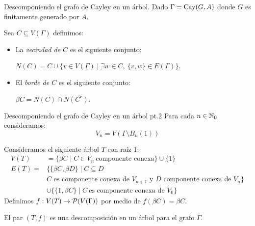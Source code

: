 \documentclass[aspectratio=169, 11pt]{beamer}
\begin{document}
	\begin{frame}[fragile]{Descomponiendo el grafo de Cayley en un árbol.}
		Dado $\Gamma = \text{Cay}(G, A)$ donde $G$ es finitamente generado por $A$.

		Sea $C \subseteq V(\Gamma)$ definimos:
		\begin{itemize}
			\item  
				La \textit{vecindad de $C$} es el siguiente conjunto:

				$N(C) = C \cup \{ v \in V(\Gamma) \mid \exists w \in C, \ \{v,w \} \in E(\Gamma) \}.$

			\item 
				El \textit{borde de $C$} es el siguiente conjunto: 

				$\beta C =  N(C) \cap N(C^{c})$.
		\end{itemize} 
	\end{frame}

	\begin{frame}[fragile]{Descomponiendo el grafo de Cayley en un árbol pt.2}
		Para cada $n \in \mathbb{N}_{0}$ consideramos:
		\[
			V_{n} = V(\Gamma \setminus B_{n}(1))	
		\]

		Consideramos el siguiente árbol $T$ con raíz $1$:
		\begin{align*}
			V(T)  & = \{ \beta C \mid C \in V_{n} \ \text{componente conexa} \}  \cup \{ 1 \} \\
			E(T)  =  & \{ \{ \beta C, \beta D \}  \mid C \subseteq D \\ 
			& \text{$C$ es componente conexa de $V_{n+1}$ y $D$ componente conexa de $V_{n}$} \} \\
			& \cup \{ \{1, \beta C\} \mid C \ \text{es componente conexa de $V_{0}$} \}
		\end{align*}
		Definimos $f: V(T) \to {\cal{P}}(V(\Gamma))$ por medio de $f(\beta C) = \beta C$.
		\begin{lema}
			El par $(T,f)$ es una descomposición en un árbol para el grafo $\Gamma$.
		\end{lema}
	\end{frame}
\end{document}
